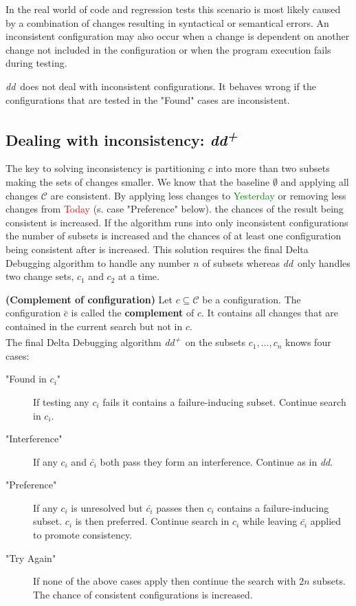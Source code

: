 \documentclass[a4paper,UKenglish]{lipics-v2018}
\newcommand{\dd}[0]{\textit{dd}}
\newcommand{\ddp}{\textit{dd\textsuperscript{+}}}
\newcommand{\green}[1]{\textcolor{green}{#1}}
\newcommand{\red}[1]{\textcolor{red}{#1}}
\newcommand{\yd}[0]{\green{Yesterday} }
\newcommand{\td}[0]{\red{Today} }
\newcommand{\C}[0]{\ensuremath{\mathcal{C}}}
\newcommand{\defsub}[1]{\textbf{(#1)} }
\begin{document}
In the real world of code and regression tests this scenario is most likely caused by a combination of changes resulting in syntactical or semantical errors. An inconsistent configuration may also occur when a change is dependent on another change not included in the configuration or when the program execution fails during testing. 

\dd\ does not deal with inconsistent configurations. It behaves wrong if the configurations that are tested in the "Found" cases are inconsistent.


\subsection{Dealing with inconsistency: \ddp}

The key to solving inconsistency is partitioning $c$ into more than two subsets making the sets of changes smaller. We know that the baseline $\emptyset$ and applying all changes $\C$ are consistent. By applying less changes to \yd or removing less changes from \td (s. case "Preference" below). the chances of the result being consistent is increased. If the algorithm runs into only inconsistent configurations the number of subsets is increased and the chances of at least one configuration being consistent after is increased. This solution requires the final Delta Debugging algorithm to handle any number $n$ of subsets whereas \dd\ only handles two change sets, $c_1$ and $c_2$ at a time.

 \defsub{Complement of configuration} Let $c \subseteq \C$ be a configuration. The configuration $\bar{c}$ is called the \textbf{complement} of $c$. It contains all changes that are contained in the current search but not in $c$.\\

The final Delta Debugging algorithm \ddp\ on the subsets $c_1, \dots, c_n$ knows four cases:\\
\begin{description}
	\item["Found in $c_i$"] If testing any $c_i$ fails it contains a failure-inducing subset. Continue search in $c_i$.
	\item["Interference"] If any $c_i$ and $\bar{c_i}$ both pass they form an interference. Continue as in \dd.
	\item["Preference"] If any $c_i$ is unresolved but $\bar{c_i}$ passes then $c_i$ contains a failure-inducing subset. $c_i$ is then preferred. Continue search in $c_i$ while leaving $\bar{c_i}$ applied to promote consistency.
	\item["Try Again"] If none of the above cases apply then continue the search with $2n$ subsets. The chance of consistent configurations is increased.
\end{description}
\end{document}
